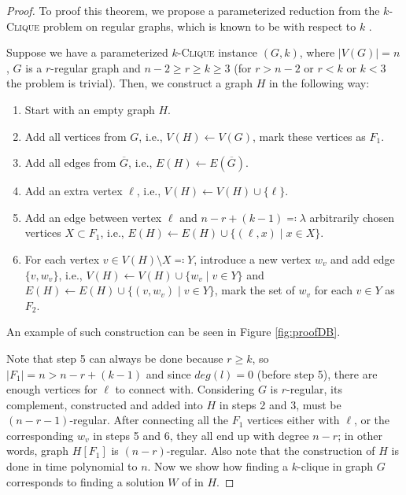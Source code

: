 \begin{proof}\label{proofDB}
    To proof this theorem, we propose a parameterized reduction from the $k$-\textsc{Clique} problem on regular graphs,
    which is known to be \Wh with respect to $k$ \cite{Mathieson2008}.
    
    Suppose we have a parameterized $k$-\textsc{Clique} instance $(G, k)$, where $|V(G)|=n$, $G$ is a $r$-regular graph and $n-2 \geq r \geq k \geq 3$
    (for $r > n-2$ or $r < k$ or $k < 3$ the problem is trivial).
    Then, we construct a graph $H$ in the following way:
    \begin{enumerate}
        \item Start with an empty graph $H$.
        \item Add all vertices from $G$, i.e., $V(H) \leftarrow V(G)$, mark these vertices as $F_1$.
        \item Add all edges from $\overline{G}$, i.e., $E(H) \leftarrow E(\overline{G})$.
        \item Add an extra vertex $\ell$, i.e., $V(H) \leftarrow V(H) \cup \{\ell\}$.
        \item Add an edge between vertex $\ell$ and $n - r + (k - 1) \eqqcolon \lambda$ arbitrarily chosen vertices $X \subset F_1$,
              i.e., $E(H) \leftarrow E(H) \cup \{ (\ell, x) \mid x \in X \}$.
        \item For each vertex $v \in V(H) \setminus X \eqqcolon Y$, introduce a new vertex $w_v$ and add edge $\{v, w_v\}$, i.e.,
              $V(H) \leftarrow V(H) \cup \{ w_v \mid v \in Y \}$ and $E(H) \leftarrow E(H) \cup \{ (v, w_v) \mid v \in Y \}$,
              mark the set of $w_v$ for each $v \in Y$ as $F_2$.
    \end{enumerate}
    An example of such construction can be seen in Figure \ref{fig:proofDB}.

    Note that step 5 can always be done because $r \ge k$, so $|F_1| = n > n - r + (k - 1)$
    and since $deg(l) = 0$ (before step 5), there are enough vertices for $\ell$ to connect with.
    Considering $G$ is $r$-regular, its complement, constructed and added into $H$ in steps 2 and 3, must be $(n-r-1)$-regular.
    After connecting all the $F_1$ vertices either with $\ell$, or the corresponding $w_v$ in steps 5 and 6,
    they all end up with degree $n-r$; in other words, graph $H[F_1]$ is $(n-r)$-regular.
    Also note that the construction of $H$ is done in time polynomial to $n$.
    Now we show how finding a $k$-clique in graph $G$ corresponds to finding a solution $W$ of \HLshort in $H$.


\end{proof}
